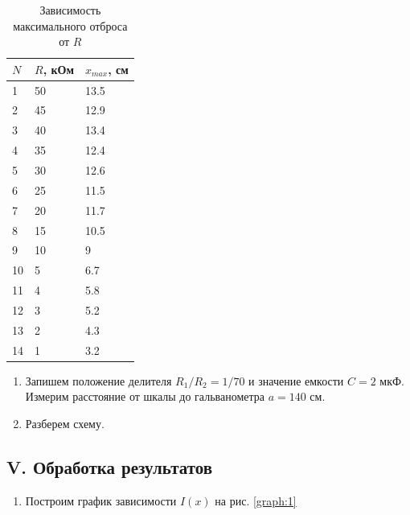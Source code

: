 \documentclass[a4paper,12pt]{article}
\begin{document}
\FloatBarrier
\begin{table}[!h]
    \centering
    \caption{Зависимость максимального отброса от $R$}
    \begin{tabular}{|l|l|l|}
        \hline
         $N$ & $R$, кОм  & $x_{max}$, см \\ \hline
        1  & 50 & 13.5 \\ \hline
        2  & 45 & 12.9 \\ \hline
        3  & 40 & 13.4 \\ \hline
        4  & 35 & 12.4 \\ \hline
        5  & 30 & 12.6 \\ \hline
        6  & 25 & 11.5 \\ \hline
        7  & 20 & 11.7 \\ \hline
        8  & 15 & 10.5 \\ \hline
        9  & 10 & 9    \\ \hline
        10 & 5  & 6.7  \\ \hline
        11 & 4  & 5.8  \\ \hline
        12 & 3  & 5.2  \\ \hline
        13 & 2  & 4.3  \\ \hline
        14 & 1  & 3.2  \\ \hline
    \end{tabular}
    \label{table:3}
\end{table}
\FloatBarrier

\begin{enumerate}[resume]
    \item Запишем положение делителя $R_1/R_2 = 1/70$ и значение емкости $C = 2$ мкФ. Измерим расстояние от шкалы до гальванометра $a = 140$ см.
    \item Разберем схему.
\end{enumerate}

\subsection*{V. Обработка результатов}

\begin{enumerate}[resume]
    \item Построим график зависимости $I(x)$ на рис. \ref{graph:1}
\end{enumerate}
\end{document}
